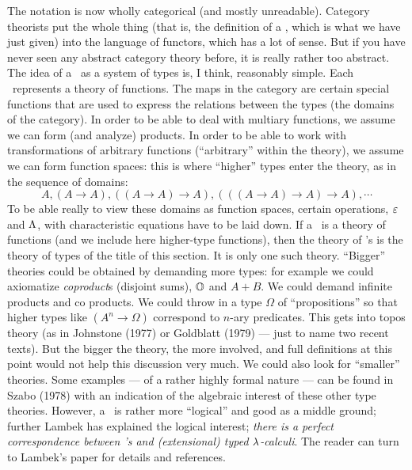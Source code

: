 The notation is now wholly categorical (and mostly unreadable). Category theorists put the
whole thing (that is, the definition of a \ccc, which is what we have just given) into the
language of functors, which has a lot of sense. But if you have never seen any abstract
category theory before, it is really rather too abstract. The idea of a \ccc\ as a system
of types is, I think, reasonably simple. Each \ccc\ represents a theory of functions. The
maps in the category are certain special functions that are used to express the relations
between the types (the domains of the category). In order to be able to deal with multiary
functions, we assume we can form (and analyze) products. In order to be able to work with
transformations of arbitrary functions (``arbitrary'' within the theory), we assume we can
form function spaces: this is where ``higher'' types enter the theory, as in the sequence
of domains:
$$
A, (A \to A), ((A \to A) \to A), (((A \to A) \to A) \to A), \cdots
$$
To be able really to view these domains as function spaces, certain operations, $\varepsilon$ and
$\Lambda$, with characteristic equations have to be laid down. If a \ccc\ is a theory of
functions (and we include here higher-type functions), then the theory of \ccc's is the
theory of types of the title of this section. It is only one such theory. ``Bigger''
theories could be obtained by demanding more types: for example we could axiomatize {\it
coproduct}s (disjoint sums), ${\mathbb O}$ and $A+ B$. We could demand infinite products and
co products. We could throw in a type $\Omega$ of ``propositions'' so that higher types
like $(A^n \to \Omega)$ correspond to $n$-ary predicates. This gets into topos theory (as
in Johnstone (1977) or Goldblatt (1979) --- just to name two recent texts). But the bigger
the theory, the more involved, and full definitions at this point would not help this
discussion very much. We could also look for ``smaller'' theories. Some examples --- of a
rather highly formal nature --- can be found in Szabo (1978) with an indication of the
algebraic interest of these other type theories. However, a \ccc\ is rather more
``logical'' and good as a middle ground; further Lambek has explained the logical
interest; {\it there is a perfect correspondence between \ccc's and (extensional) typed
$\lambda$-calculi}. The reader can turn to Lambek's paper for details and references.

\def\means#1{\llbracket\, #1 \,\rrbracket}


